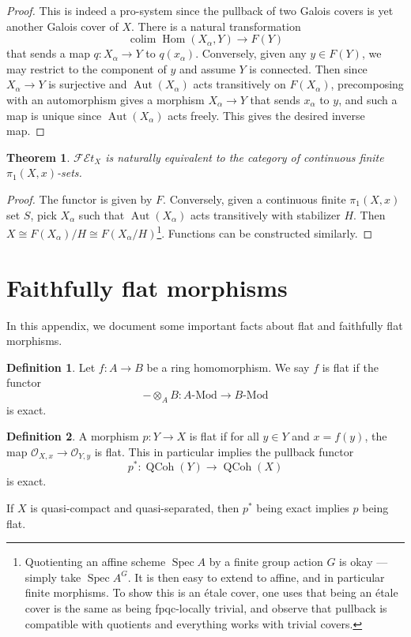 \documentclass{shortart}
\newtheorem*{thm}{Theorem}
\theoremstyle{definition}
\newtheorem*{defi}{Definition}
\newcommand\FEt[1]{\mathscr{FE}t_{#1}}
\DeclareMathOperator\Spec{Spec}
\DeclareMathOperator\Aut{Aut}
\DeclareMathOperator\QCoh{QCoh}
\DeclareMathOperator\Hom{Hom}
\DeclareMathOperator*\colim{colim}
\begin{document}
\begin{proof}
  This is indeed a pro-system since the pullback of two Galois covers is yet another Galois cover of $X$. There is a natural transformation
  \[
    \colim \Hom(X_\alpha, Y) \to F(Y)
  \]
  that sends a map $q: X_\alpha \to Y$ to $q(x_\alpha)$. Conversely, given any $y \in F(Y)$, we may restrict to the component of $y$ and assume $Y$ is connected. Then since $X_\alpha \to Y$ is surjective and $\Aut(X_\alpha)$ acts transitively on $F(X_\alpha)$, precomposing with an automorphism gives a morphism $X_\alpha \to Y$ that sends $x_\alpha$ to $y$, and such a map is unique since $\Aut(X_\alpha)$ acts freely. This gives the desired inverse map.
\end{proof}

\begin{thm}
  $\FEt{X}$ is naturally equivalent to the category of continuous finite $\pi_1(X, x)$-sets.
\end{thm}

\begin{proof}\leavevmode
  The functor is given by $F$. Conversely, given a continuous finite $\pi_1(X, x)$ set $S$, pick $X_\alpha$ such that $\Aut(X_\alpha)$ acts transitively with stabilizer $H$. Then $X \cong F(X_\alpha)/H \cong F(X_\alpha/H)$\footnote{Quotienting an affine scheme $\Spec A$ by a finite group action $G$ is okay --- simply take $\Spec A^G$. It is then easy to extend to affine, and in particular finite morphisms. To show this is an \'etale cover, one uses that being an \'etale cover is the same as being fpqc-locally trivial, and observe that pullback is compatible with quotients and everything works with trivial covers.}. Functions can be constructed similarly.
\end{proof}

\appendices
\section{Faithfully flat morphisms}
In this appendix, we document some important facts about flat and faithfully flat morphisms.
\begin{defi}
  Let $f: A \to B$ be a ring homomorphism. We say $f$ is flat if the functor
  \[
    -\otimes_A B: A\text{-Mod} \to B\text{-Mod}
  \]
  is exact.
\end{defi}

\begin{defi}
  A morphism $p: Y \to X$ is flat if for all $y \in Y$ and $x = f(y)$, the map $\mathcal{O}_{X, x} \to \mathcal{O}_{Y, y}$ is flat. This in particular implies the pullback functor
  \[
    p^*: \QCoh(Y) \to \QCoh(X)
  \]
  is exact.
\end{defi}
If $X$ is quasi-compact and quasi-separated, then $p^*$ being exact implies $p$ being flat.
\end{document}
